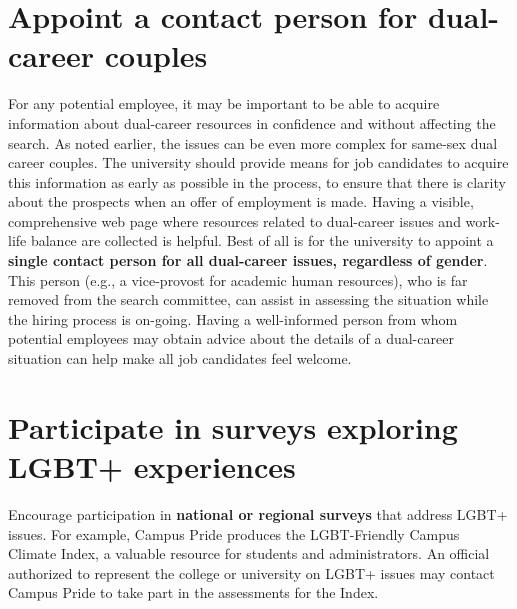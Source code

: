 \section {Appoint a contact person for dual-career couples}
\label{dual-career-contact}
For any potential employee, it may be important to be able to acquire information about dual-career resources in confidence and without affecting the search.  As noted earlier, the issues can be even more complex for same-sex dual career couples. The university should provide means for job candidates to acquire this information as early as possible in the process, to ensure that there is clarity about the prospects when an offer of employment is made.  Having a visible, comprehensive web page where resources related to dual-career issues and work-life balance are collected is helpful.  Best of all is for the university to appoint a \textbf{single contact person for all dual-career issues, regardless of gender}. This person (e.g., a vice-provost for academic human resources), who is far removed from the search committee, can assist in assessing the situation while the hiring process is on-going.  Having a well-informed person from whom potential employees may obtain advice about the details of a dual-career situation can help make all job candidates feel welcome.


\section [Participate in surveys exploring LGBT+ experiences]{Participate in surveys exploring LGBT+ experiences}
\label{univ-surveys}
Encourage participation in \textbf{national or regional surveys} that address LGBT+ issues. For example, Campus Pride produces the LGBT-Friendly Campus Climate Index, a valuable resource for students and administrators. An official authorized to represent the college or university on LGBT+ issues may contact Campus Pride to take part in the assessments for the Index.


















